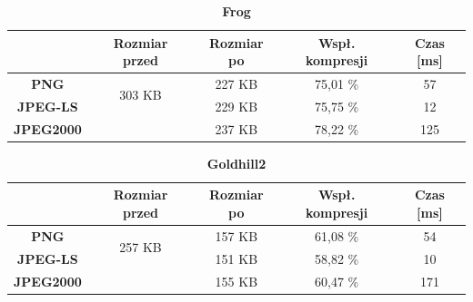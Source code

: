 \begin{table}[!h]
	\centering
	\caption{\textbf{Frog}}
	\label{my-label}
	\begin{tabular}{|c|c|c|c|c|}                                             
		\hline
		& \textbf{Rozmiar przed} & \textbf{Rozmiar po} & \textbf{Wspł. kompresji} & \textbf{Czas {[}ms{]}} \\ \hline 
		\textbf{PNG}      &          \multicolumn{1}{c|}{\multirow{2}{*}{303 KB}}             &        227 KB             &    75,01 \%                     &           57                  \\\cline{3-5}
		\textbf{JPEG-LS}  &                        &      229 KB               &       75,75 \%                  &         12                 \\\cline{3-5}
		\textbf{JPEG2000} &                        &      237 KB               &       78,22 \%                  &      125                \\ \hline
	\end{tabular}
\end{table}

\begin{table}[!h]
	\centering
	\caption{\textbf{Goldhill2}}
	\label{my-label}
	\begin{tabular}{|c|c|c|c|c|}                                             
		\hline
		& \textbf{Rozmiar przed} & \textbf{Rozmiar po} & \textbf{Wspł. kompresji} & \textbf{Czas {[}ms{]}} \\ \hline 
		\textbf{PNG}      &          \multicolumn{1}{c|}{\multirow{2}{*}{257 KB}}             &        157 KB             &      61,08 \%                   &               54              \\\cline{3-5}
		\textbf{JPEG-LS}  &                        &       151 KB              &         58,82 \%                &            10              \\\cline{3-5}
		\textbf{JPEG2000} &                        &       155 KB              &         60,47 \%                &       171               \\ \hline
	\end{tabular}
\end{table}

